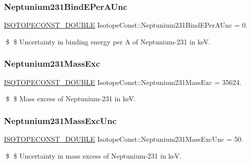 \subsubsection{\texorpdfstring{Neptunium231\+Bind\+E\+Per\+A\+Unc}{Neptunium231BindEPerAUnc}}
{\footnotesize\ttfamily \mbox{\hyperlink{group___isotope_const-_macros_ga8f45a7272ce02c0b4c65c44636ed719a}{I\+S\+O\+T\+O\+P\+E\+C\+O\+N\+S\+T\+\_\+\+D\+O\+U\+B\+LE}} Isotope\+Const\+::\+Neptunium231\+Bind\+E\+Per\+A\+Unc = 0.}

\$ \$ Uncertainty in binding energy per A of Neptunium-\/231 in keV. \mbox{\label{group___isotope_const-_neptunium-_np231_gaf36ef4c576e1abb0527815c001fbf4f7}} 
\subsubsection{\texorpdfstring{Neptunium231\+Mass\+Exc}{Neptunium231MassExc}}
{\footnotesize\ttfamily \mbox{\hyperlink{group___isotope_const-_macros_ga8f45a7272ce02c0b4c65c44636ed719a}{I\+S\+O\+T\+O\+P\+E\+C\+O\+N\+S\+T\+\_\+\+D\+O\+U\+B\+LE}} Isotope\+Const\+::\+Neptunium231\+Mass\+Exc = 35624.}

\$ \$ Mass excess of Neptunium-\/231 in keV. \mbox{\label{group___isotope_const-_neptunium-_np231_gaadfc4107b5eab784dddd9cff1820a4fc}} 
\subsubsection{\texorpdfstring{Neptunium231\+Mass\+Exc\+Unc}{Neptunium231MassExcUnc}}
{\footnotesize\ttfamily \mbox{\hyperlink{group___isotope_const-_macros_ga8f45a7272ce02c0b4c65c44636ed719a}{I\+S\+O\+T\+O\+P\+E\+C\+O\+N\+S\+T\+\_\+\+D\+O\+U\+B\+LE}} Isotope\+Const\+::\+Neptunium231\+Mass\+Exc\+Unc = 50.}

\$ \$ Uncertainty in mass excess of Neptunium-\/231 in keV. \mbox{\label{group___isotope_const-_neptunium-_np231_ga0d2e4b132ffa35c0a630c232aca39707}} 

